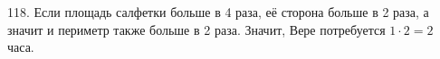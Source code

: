 118. Если площадь салфетки больше в 4 раза, её сторона больше в 2 раза, а значит и периметр также больше в 2 раза. Значит, Вере потребуется $1\cdot2=2$ часа.\\
